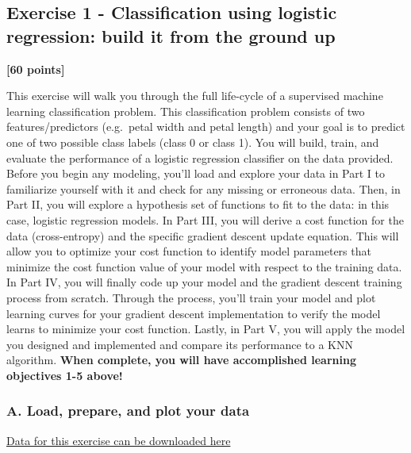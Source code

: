 \documentclass[
  letterpaper,
  DIV=11,
  numbers=noendperiod]{scrartcl}
\begin{document}
\subsection{Exercise 1 - Classification using logistic regression: build
it from the ground
up}\label{exercise-1---classification-using-logistic-regression-build-it-from-the-ground-up}

\textbf{{[}60 points{]}}

This exercise will walk you through the full life-cycle of a supervised
machine learning classification problem. This classification problem
consists of two features/predictors (e.g.~petal width and petal length)
and your goal is to predict one of two possible class labels (class 0 or
class 1). You will build, train, and evaluate the performance of a
logistic regression classifier on the data provided. Before you begin
any modeling, you'll load and explore your data in Part I to familiarize
yourself with it and check for any missing or erroneous data. Then, in
Part II, you will explore a hypothesis set of functions to fit to the
data: in this case, logistic regression models. In Part III, you will
derive a cost function for the data (cross-entropy) and the specific
gradient descent update equation. This will allow you to optimize your
cost function to identify model parameters that minimize the cost
function value of your model with respect to the training data. In Part
IV, you will finally code up your model and the gradient descent
training process from scratch. Through the process, you'll train your
model and plot learning curves for your gradient descent implementation
to verify the model learns to minimize your cost function. Lastly, in
Part V, you will apply the model you designed and implemented and
compare its performance to a KNN algorithm. \textbf{When complete, you
will have accomplished learning objectives 1-5 above!}

\subsubsection{A. Load, prepare, and plot your
data}\label{a.-load-prepare-and-plot-your-data}

\begin{tcolorbox}[enhanced jigsaw, colback=white, bottomtitle=1mm, rightrule=.15mm, colbacktitle=quarto-callout-note-color!10!white, coltitle=black, leftrule=.75mm, toprule=.15mm, arc=.35mm, opacityback=0, opacitybacktitle=0.6, toptitle=1mm, title=\textcolor{quarto-callout-note-color}{\faInfo}\hspace{0.5em}{Note}, titlerule=0mm, breakable, colframe=quarto-callout-note-color-frame, bottomrule=.15mm, left=2mm]

\href{https://github.com/kylebradbury/ids705/tree/main/notebooks/data/a3}{Data
for this exercise can be downloaded here}

\end{tcolorbox}
\end{document}
